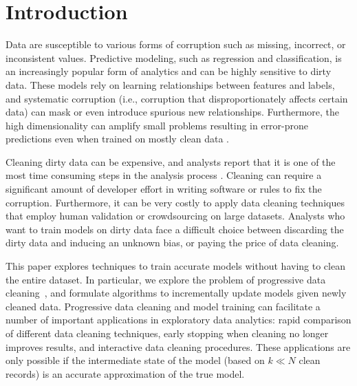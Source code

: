 \section{Introduction}
Data are susceptible to various forms of corruption such as missing, incorrect, or inconsistent values.
Predictive modeling, such as regression and classification, is an increasingly popular form of analytics \cite{bdas, alexandrov2014stratosphere, crotty2014tupleware, hellerstein2012madlib} and can be highly sensitive to dirty data.
These models rely on learning relationships between features and labels, and systematic corruption \cite{taylor1982introduction} (i.e., corruption that disproportionately affects certain data) can mask or even introduce spurious new relationships.
Furthermore, the high dimensionality can amplify small problems resulting in error-prone predictions even when trained on mostly clean data \cite{xiaofeature}.

Cleaning dirty data can be expensive, and analysts report that it is one of the most time consuming steps in the analysis process \cite{nytimes}.
Cleaning can require a significant amount of developer effort in writing software or rules to fix the corruption.
Furthermore, it can be very costly to apply data cleaning techniques that employ human validation or crowdsourcing on large datasets.
Analysts who want to train models on dirty data face a difficult choice between discarding the dirty data and inducing an unknown bias, or paying the price of data cleaning.

This paper explores techniques to train accurate models without having to clean the entire dataset.
In particular, we explore the problem of progressive data cleaning~\cite{altowim2014progressive, whang2014incremental, papenbrock2015progressive, gruenheid2014incremental, mayfield2010eracer, DBLP:journals/pvldb/YakoutENOI11, yakout2013don}, and formulate algorithms to incrementally update models given newly cleaned data.
Progressive data cleaning and model training can facilitate a number of important applications in exploratory data analytics: rapid comparison of different data cleaning techniques, early stopping when cleaning no longer improves results, and interactive data cleaning procedures.
These applications are only possible if the intermediate state of the model (based on $k \ll N$ clean records) is an accurate approximation of the true model.

